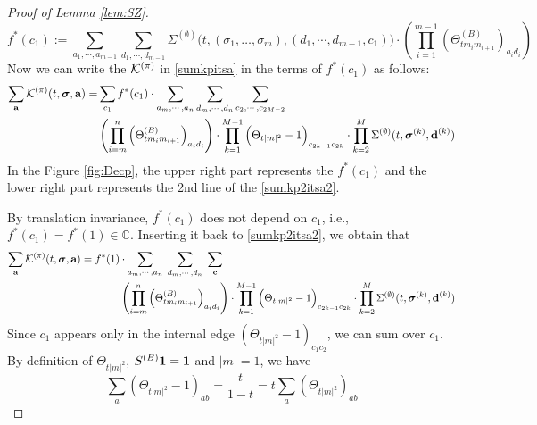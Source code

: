 \documentclass[10pt,reqno]{article}
\theoremstyle{plain} %
\theoremstyle{remark}
\numberwithin{equation}{section}
\begin{document}
\begin{proof}[ Proof of Lemma  \ref{lem:SZ}]
 $$
f^*(c_1):=\sum_{a_1,\cdots, a_{m-1}}\sum_{d_1,\cdots, d_{m-1}}\Sigma^{(\emptyset)}\Bigg(t, (\sigma_1,\ldots,\sigma_m), (d_1,\cdots, d_{m-1}, c_1)\Bigg)\cdot  \left(\prod_{i=1}^{m-1}\left(\Theta^{(B)}_{tm_im_{i+1}}\right)_{a_id_i}\right) 
$$
Now we can write the $\cal K^{(\pi)}$ in \eqref{sumkpitsa} in the terms of $f^*(c_1)$ as follows: 
\begin{align}\label{sumkp2itsa2}
\sum_{\textbf{a}}{\cal K}^{(\pi)}(t, \boldsymbol{\sigma}, \textbf{a})=& \sum_{c_1} f^*(c_1)\cdot  
\sum_{a_m,\cdots , a_n}
\sum_{d_m,\cdots , d_n}
\sum_{c_2,\cdots,c_{2M-2}}\\\nonumber
&\left(\prod_{i=m}^{n}\left(\Theta^{(B)}_{tm_im_{i+1}}\right)_{a_id_i}\right)\cdot \prod_{k=1}^{M-1}\Big(\Theta_{{t|m|^2}}-1\Big)_{c_{2k-1}c_{2k}}
\cdot
 \prod_{k=2}^{M}{\Sigma}^{(\emptyset)}(t, \boldsymbol{\sigma}^{(k)}, \textbf{d}^{(k)})   
\end{align}
In the Figure \ref{fig:Decp}, the upper right part represents the $f ^*(c_1)$ and the lower right part represents the 2nd line of the \eqref{sumkp2itsa2}. 

By translation invariance, $f^*(c_1)$ does not depend on $c_1$, i.e.,
$f^*(c_1)= f^*(1)\in \mathbb C$.
Inserting it  back to \eqref{sumkp2itsa2}, we obtain that
\begin{align}\label{sumkp3itsa3}
\sum_{\textbf{a}}{\cal K}^{(\pi)}(t, \boldsymbol{\sigma}, \textbf{a})=f^*(1) &\cdot  
\sum_{a_m,\cdots , a_n}\;
\sum_{d_m,\cdots , d_n}\;
\sum_{\textbf{c}}\\\nonumber
&\left(\prod_{i=m}^{n}\left(\Theta^{(B)}_{tm_im_{i+1}}\right)_{a_id_i}\right)\cdot \prod_{k=1}^{M-1}\Big(\Theta_{{t|m|^2}}-1\Big)_{c_{2k-1}c_{2k}}
\cdot
 \prod_{k=2}^{M}{\Sigma}^{(\emptyset)}(t, \boldsymbol{\sigma}^{(k)}, \textbf{d}^{(k)})   
\end{align}
Since   $c_1$  appears only  in the internal edge $ (\Theta_{{t|m|^2}}-1 )_{c_1c_2}$, we can sum over $c_1$. By definition of 
$\Theta_{{t|m|^2}}$,  $S^{(B)} \bf 1 = \bf 1$ and $|m|=1$, we have 
$$  \sum_{a}\left(\Theta_{t|m|^2}-1\right)_{ab}= \frac t { 1-t} =t \sum_{a}\left(\Theta_{t|m|^2}\right)_{ab}
$$


\end{proof}
\end{document}
